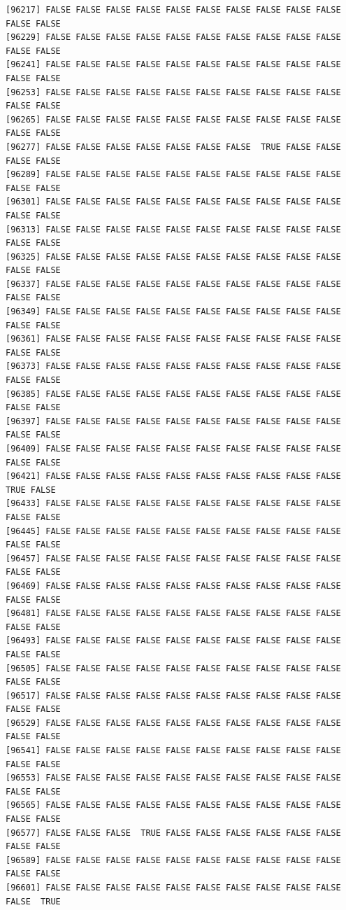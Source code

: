\documentclass[
  a4paper,
  DIV=11,
  numbers=noendperiod]{scrartcl}
\begin{document}
\begin{verbatim}
[96217] FALSE FALSE FALSE FALSE FALSE FALSE FALSE FALSE FALSE FALSE FALSE FALSE
[96229] FALSE FALSE FALSE FALSE FALSE FALSE FALSE FALSE FALSE FALSE FALSE FALSE
[96241] FALSE FALSE FALSE FALSE FALSE FALSE FALSE FALSE FALSE FALSE FALSE FALSE
[96253] FALSE FALSE FALSE FALSE FALSE FALSE FALSE FALSE FALSE FALSE FALSE FALSE
[96265] FALSE FALSE FALSE FALSE FALSE FALSE FALSE FALSE FALSE FALSE FALSE FALSE
[96277] FALSE FALSE FALSE FALSE FALSE FALSE FALSE  TRUE FALSE FALSE FALSE FALSE
[96289] FALSE FALSE FALSE FALSE FALSE FALSE FALSE FALSE FALSE FALSE FALSE FALSE
[96301] FALSE FALSE FALSE FALSE FALSE FALSE FALSE FALSE FALSE FALSE FALSE FALSE
[96313] FALSE FALSE FALSE FALSE FALSE FALSE FALSE FALSE FALSE FALSE FALSE FALSE
[96325] FALSE FALSE FALSE FALSE FALSE FALSE FALSE FALSE FALSE FALSE FALSE FALSE
[96337] FALSE FALSE FALSE FALSE FALSE FALSE FALSE FALSE FALSE FALSE FALSE FALSE
[96349] FALSE FALSE FALSE FALSE FALSE FALSE FALSE FALSE FALSE FALSE FALSE FALSE
[96361] FALSE FALSE FALSE FALSE FALSE FALSE FALSE FALSE FALSE FALSE FALSE FALSE
[96373] FALSE FALSE FALSE FALSE FALSE FALSE FALSE FALSE FALSE FALSE FALSE FALSE
[96385] FALSE FALSE FALSE FALSE FALSE FALSE FALSE FALSE FALSE FALSE FALSE FALSE
[96397] FALSE FALSE FALSE FALSE FALSE FALSE FALSE FALSE FALSE FALSE FALSE FALSE
[96409] FALSE FALSE FALSE FALSE FALSE FALSE FALSE FALSE FALSE FALSE FALSE FALSE
[96421] FALSE FALSE FALSE FALSE FALSE FALSE FALSE FALSE FALSE FALSE  TRUE FALSE
[96433] FALSE FALSE FALSE FALSE FALSE FALSE FALSE FALSE FALSE FALSE FALSE FALSE
[96445] FALSE FALSE FALSE FALSE FALSE FALSE FALSE FALSE FALSE FALSE FALSE FALSE
[96457] FALSE FALSE FALSE FALSE FALSE FALSE FALSE FALSE FALSE FALSE FALSE FALSE
[96469] FALSE FALSE FALSE FALSE FALSE FALSE FALSE FALSE FALSE FALSE FALSE FALSE
[96481] FALSE FALSE FALSE FALSE FALSE FALSE FALSE FALSE FALSE FALSE FALSE FALSE
[96493] FALSE FALSE FALSE FALSE FALSE FALSE FALSE FALSE FALSE FALSE FALSE FALSE
[96505] FALSE FALSE FALSE FALSE FALSE FALSE FALSE FALSE FALSE FALSE FALSE FALSE
[96517] FALSE FALSE FALSE FALSE FALSE FALSE FALSE FALSE FALSE FALSE FALSE FALSE
[96529] FALSE FALSE FALSE FALSE FALSE FALSE FALSE FALSE FALSE FALSE FALSE FALSE
[96541] FALSE FALSE FALSE FALSE FALSE FALSE FALSE FALSE FALSE FALSE FALSE FALSE
[96553] FALSE FALSE FALSE FALSE FALSE FALSE FALSE FALSE FALSE FALSE FALSE FALSE
[96565] FALSE FALSE FALSE FALSE FALSE FALSE FALSE FALSE FALSE FALSE FALSE FALSE
[96577] FALSE FALSE FALSE  TRUE FALSE FALSE FALSE FALSE FALSE FALSE FALSE FALSE
[96589] FALSE FALSE FALSE FALSE FALSE FALSE FALSE FALSE FALSE FALSE FALSE FALSE
[96601] FALSE FALSE FALSE FALSE FALSE FALSE FALSE FALSE FALSE FALSE FALSE  TRUE

\end{verbatim}
\end{document}
